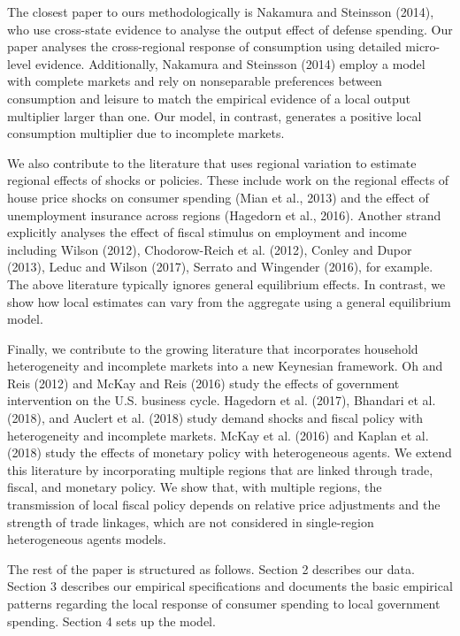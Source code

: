 \documentclass[10pt]{article}
\begin{document}
The closest paper to ours methodologically is Nakamura and Steinsson (2014), who use cross-state evidence to analyse the output effect of defense spending. Our paper analyses the cross-regional response of consumption using detailed micro-level evidence. Additionally, Nakamura and Steinsson (2014) employ a model with complete markets and rely on nonseparable preferences between consumption and leisure to match the empirical evidence of a local output multiplier larger than one. Our model, in contrast, generates a positive local consumption multiplier due to incomplete markets.

We also contribute to the literature that uses regional variation to estimate regional effects of shocks or policies. These include work on the regional effects of house price shocks on consumer spending (Mian et al., 2013) and the effect of unemployment insurance across regions (Hagedorn et al., 2016). Another strand explicitly analyses the effect of fiscal stimulus on employment and income including Wilson (2012), Chodorow-Reich et al. (2012), Conley and Dupor (2013), Leduc and Wilson (2017), Serrato and Wingender (2016), for example. The above literature typically ignores general equilibrium effects. In contrast, we show how local estimates can vary from the aggregate using a general equilibrium model.

Finally, we contribute to the growing literature that incorporates household heterogeneity and incomplete markets into a new Keynesian framework. Oh and Reis (2012) and McKay and Reis (2016) study the effects of government intervention on the U.S. business cycle. Hagedorn et al. (2017), Bhandari et al. (2018), and Auclert et al. (2018) study demand shocks and fiscal policy with heterogeneity and incomplete markets. McKay et al. (2016) and Kaplan et al. (2018) study the effects of monetary policy with heterogeneous agents. We extend this literature by incorporating multiple regions that are linked through trade, fiscal, and monetary policy. We show that, with multiple regions, the transmission of local fiscal policy depends on relative price adjustments and the strength of trade linkages, which are not considered in single-region heterogeneous agents models.

The rest of the paper is structured as follows. Section 2 describes our data. Section 3 describes our empirical specifications and documents the basic empirical patterns regarding the local response of consumer spending to local government spending. Section 4 sets up the model.
\end{document}
